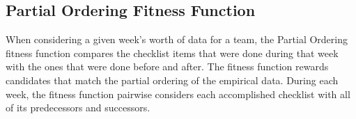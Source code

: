 \documentclass[preprint,12pt,3p]{elsarticle}
\begin{document}
\subsection{Partial Ordering Fitness Function}
When considering a given week's worth of data for a team, the Partial Ordering fitness function compares the checklist items that were done during that week with the ones that were done before and after. The fitness function rewards candidates that match the partial ordering of the empirical data. During each week, the fitness function pairwise considers each accomplished checklist with all of its predecessors and successors. 




\end{document}
